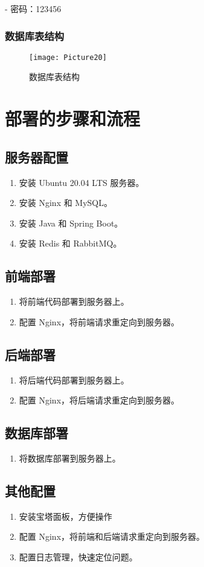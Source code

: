 - 密码：123456


\subsubsection{数据库表结构}

\begin{figure}[H]
  \centering
  \texttt{[image: Picture20]}
  \caption{数据库表结构}\label{fig:xml}
  \vspace{\baselineskip}
\end{figure}



\section{部署的步骤和流程}

\subsection{服务器配置}
\begin{enumerate}
  \item 安装 Ubuntu 20.04 LTS 服务器。
  \item 安装 Nginx 和 MySQL。
  \item 安装 Java 和 Spring Boot。
  \item 安装 Redis 和 RabbitMQ。
\end{enumerate}
\subsection{前端部署}
\begin{enumerate}
  \item 将前端代码部署到服务器上。
  \item 配置 Nginx，将前端请求重定向到服务器。
\end{enumerate}
\subsection{后端部署}
\begin{enumerate}
  \item 将后端代码部署到服务器上。
  \item 配置 Nginx，将后端请求重定向到服务器。
\end{enumerate}
\subsection{数据库部署}
\begin{enumerate}
  \item 将数据库部署到服务器上。
\end{enumerate}
\subsection{其他配置}
\begin{enumerate}
  \item 安装宝塔面板，方便操作
  \item 配置 Nginx，将前端和后端请求重定向到服务器。
  \item 配置日志管理，快速定位问题。
\end{enumerate}
